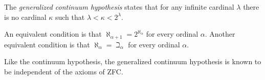 \documentclass[12pt]{article}
\begin{document}

The \emph{generalized continuum hypothesis} states that for any infinite cardinal $\lambda$ there is no cardinal $\kappa$ such that $\lambda <\kappa <2^{\lambda}$.

An equivalent condition is that $\aleph_{\alpha+1}=2^{\aleph_\alpha}$ for every ordinal $\alpha$.
Another equivalent condition is that $\aleph_\alpha=\beth_\alpha$ for every ordinal $\alpha$.

Like the continuum hypothesis, the generalized continuum hypothesis is known to be independent of the axioms of ZFC.
\end{document}
